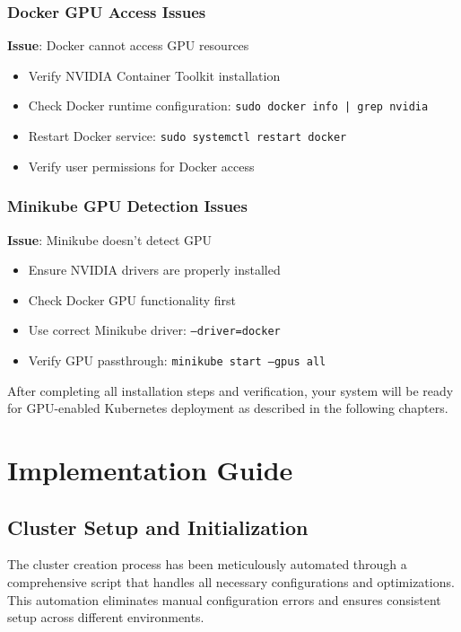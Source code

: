 \documentclass[12pt,a4paper]{report}
\begin{document}
\subsection{Docker GPU Access Issues}
\textbf{Issue}: Docker cannot access GPU resources
\begin{itemize}
    \item Verify NVIDIA Container Toolkit installation
    \item Check Docker runtime configuration: \texttt{sudo docker info | grep nvidia}
    \item Restart Docker service: \texttt{sudo systemctl restart docker}
    \item Verify user permissions for Docker access
\end{itemize}

\subsection{Minikube GPU Detection Issues}
\textbf{Issue}: Minikube doesn't detect GPU
\begin{itemize}
    \item Ensure NVIDIA drivers are properly installed
    \item Check Docker GPU functionality first
    \item Use correct Minikube driver: \texttt{--driver=docker}
    \item Verify GPU passthrough: \texttt{minikube start --gpus all}
\end{itemize}

After completing all installation steps and verification, your system will be ready for GPU-enabled Kubernetes deployment as described in the following chapters.

\chapter{Implementation Guide}
\label{chap:implementation}

\section{Cluster Setup and Initialization}
The cluster creation process has been meticulously automated through a comprehensive script that handles all necessary configurations and optimizations. This automation eliminates manual configuration errors and ensures consistent setup across different environments.
\end{document}
